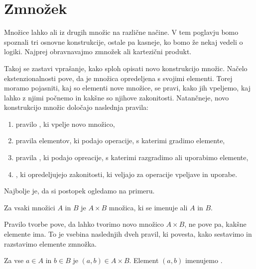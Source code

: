 

\section{Zmnožek}
\label{sec:zmnozek}

Množice lahko  ali  iz drugih množic na različne načine. V
tem poglavju bomo spoznali tri osnovne konstrukcije, ostale pa kasneje, ko bomo že nekaj
vedeli o logiki. Najprej obravnavajmo zmnožek ali kartezični produkt.

Takoj se zastavi vprašanje, kako sploh opisati novo konstrukcijo množic. Načelo
ekstenzionalnosti pove, da je množica opredeljena s svojimi elementi. Torej moramo
pojasniti, kaj so elementi nove množice, se pravi, kako jih vpeljemo, kaj lahko z njimi
počnemo in kakšne so njihove zakonitosti. Natančneje, novo konstrukcijo množic
določajo naslednja pravila:
%
\begin{enumerate}
\item pravilo , ki vpelje novo množico,
\item pravila  elementov, ki podajo operacije, s katerimi gradimo elemente,
\item pravila , ki podajo opreacije, s katerimi razgradimo ali uporabimo elemente,
\item {}, ki opredeljujejo zakonitosti, ki veljajo za operacije vpeljave in uporabe.
\end{enumerate}
%
Najbolje je, da si postopek ogledamo na primeru.

\begin{pravilo}
  \label{pravilo:zmnozek-tvorba}
  Za vsaki množici $A$ in $B$ je $A \times B$ množica, ki se imenuje  ali
   $A$ in $B$.
\end{pravilo}

\noindent
%
Pravilo tvorbe pove, da lahko tvorimo novo množico $A \times B$, ne pove pa, kakšne
elemente ima. To je vsebina naslednjih dveh pravil, ki povesta, kako sestavimo in
razstavimo elemente zmnožka.

\begin{pravilo}
  \label{pravilo:zmnozek-vpeljava}
  Za vse $a \in A$ in $b \in B$ je $(a, b) \in A \times B$. Element $(a, b)$ imenujemo
  .
\end{pravilo}

